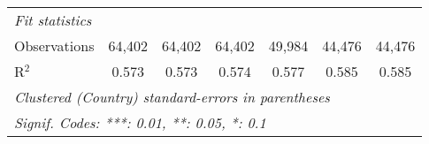 \begin{tabular}{lcccccc}
   \midrule \emph{Fit statistics}\\
   Observations                                                                                    & 64,402  & 64,402         & 64,402         & 49,984         & 44,476         & 44,476\\  
   R$^2$                                                                                           & 0.573   & 0.573          & 0.574          & 0.577          & 0.585          & 0.585\\  
   \midrule
   \multicolumn{7}{l}{\emph{Clustered (Country) standard-errors in parentheses}}\\
   \multicolumn{7}{l}{\emph{Signif. Codes: ***: 0.01, **: 0.05, *: 0.1}}\\
\end{tabular}
\par\endgroup


